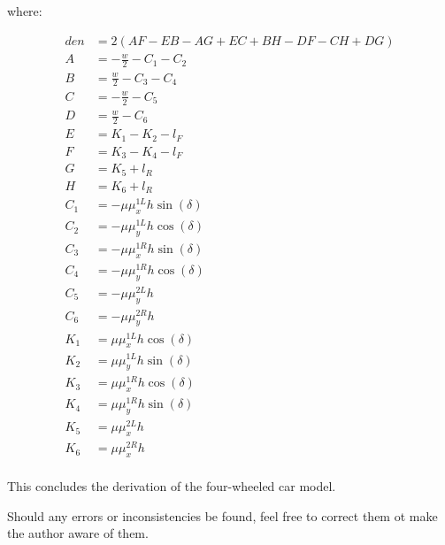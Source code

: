 \documentclass[paper=a4, fontsize=11pt]{scrartcl} %
\numberwithin{equation}{section} %
\numberwithin{figure}{section} %
\numberwithin{table}{section} %
\begin{document}
where:

\begin{align}
den &= 2(AF - EB - AG + EC + BH - DF - CH + DG) \\
A &= -\frac{w}{2} - C_1 - C_2 \\
B &= \frac{w}{2} - C_3 - C_4 \\
C &= -\frac{w}{2} - C_5 \\
D &= \frac{w}{2} - C_6 \\
E &= K_1 - K_2 - l_F \\
F &= K_3 - K_4 - l_F \\
G &= K_5 + l_R \\
H &= K_6 + l_R \\
C_1 &= -\mu \mu^{1L}_x h \sin(\delta) \\
C_2 &= -\mu \mu^{1L}_y h \cos(\delta) \\
C_3 &= -\mu \mu^{1R}_x h \sin(\delta) \\
C_4 &= -\mu \mu^{1R}_y h \cos(\delta) \\
C_5 &= -\mu \mu^{2L}_y h  \\
C_6 &= -\mu \mu^{2R}_y h  \\
K_1 &= \mu \mu^{1L}_x h \cos(\delta) \\
K_2 &= \mu \mu^{1L}_y h \sin(\delta) \\
K_3 &= \mu \mu^{1R}_x h \cos(\delta) \\
K_4 &= \mu \mu^{1R}_y h \sin(\delta) \\
K_5 &= \mu \mu^{2L}_x h \\
K_6 &= \mu \mu^{2R}_x h \\
\end{align}

This concludes the derivation of the four-wheeled car model.


Should any errors or inconsistencies be found, feel free to correct them ot make the author aware of them.



\end{document}
